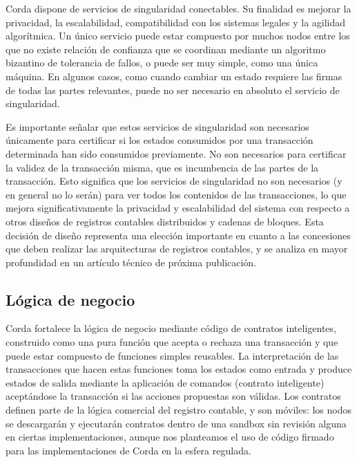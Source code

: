 \documentclass{article}
\begin{document}
Corda dispone de servicios de singularidad conectables. Su finalidad es mejorar la privacidad, la escalabilidad, compatibilidad con los sistemas legales\cite{EUC} y la agilidad algorítmica. Un único servicio puede estar compuesto por muchos nodos entre los que no existe relación de confianza que se coordinan mediante un algoritmo bizantino de tolerancia de fallos, o puede ser muy simple, como una única máquina. En algunos casos, como cuando cambiar un estado requiere las firmas de todas las partes relevantes, puede no ser necesario en absoluto el servicio de singularidad. 

Es importante señalar que estos servicios de singularidad son necesarios únicamente para certificar si los estados consumidos por una transacción determinada han sido consumidos previamente. No son necesarios para certificar la validez de la transacción misma, que es incumbencia de las partes de la transacción. Esto significa que los servicios de singularidad no son necesarios (y en general no lo serán) para ver todos los contenidos de las transacciones, lo que mejora significativamente la privacidad y escalabilidad del sistema con respecto a otros diseños de registros contables distribuidos y cadenas de bloques.  Esta decisión de diseño representa una elección importante en cuanto a las concesiones que deben realizar las arquitecturas de registros contables, y se analiza en mayor profundidad en un artículo técnico de próxima publicación.

\subsection{Lógica de negocio}
Corda fortalece la lógica de negocio mediante código de contratos inteligentes, construido como una pura función que acepta o rechaza una transacción y que puede estar compuesto de funciones simples reusables. La interpretación de las transacciones que hacen estas funciones toma los estados como entrada y produce estados de salida mediante la aplicación de comandos (contrato inteligente) aceptándose la transacción si las acciones propuestas son válidas. Los contratos definen parte de la lógica comercial del registro contable, y son móviles: los nodos se descargarán y ejecutarán contratos dentro de una sandbox sin revisión alguna en ciertas implementaciones, aunque nos planteamos el uso de código firmado para las implementaciones de Corda en la esfera regulada. 
\end{document}
